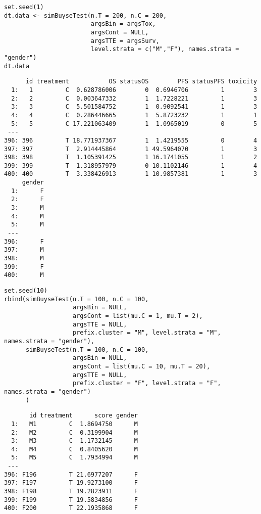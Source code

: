 \documentclass[12pt]{article}
\begin{document}
\lstset{language=r,label= ,caption= ,captionpos=b,numbers=none}
\begin{lstlisting}
set.seed(1)
dt.data <- simBuyseTest(n.T = 200, n.C = 200,
                        argsBin = argsTox,
                        argsCont = NULL,
                        argsTTE = argsSurv,
                        level.strata = c("M","F"), names.strata = "gender")
dt.data
\end{lstlisting}

\begin{verbatim}
      id treatment           OS statusOS        PFS statusPFS toxicity
  1:   1         C  0.628786006        0  0.6946706         1        3
  2:   2         C  0.003647332        1  1.7228221         1        3
  3:   3         C  5.501584752        1  0.9092541         1        3
  4:   4         C  0.286446665        1  5.8723232         1        1
  5:   5         C 17.221063409        1  1.0965019         0        5
 ---                                                                  
396: 396         T 18.771937367        1  1.4219555         0        4
397: 397         T  2.914445864        1 49.5964070         1        3
398: 398         T  1.105391425        1 16.1741055         1        2
399: 399         T  1.318957979        0 10.1102146         1        4
400: 400         T  3.338426913        1 10.9857381         1        3
     gender
  1:      F
  2:      F
  3:      M
  4:      M
  5:      M
 ---       
396:      F
397:      M
398:      M
399:      F
400:      M
\end{verbatim}


\lstset{language=r,label= ,caption= ,captionpos=b,numbers=none}
\begin{lstlisting}
set.seed(10)
rbind(simBuyseTest(n.T = 100, n.C = 100,
                   argsBin = NULL,
                   argsCont = list(mu.C = 1, mu.T = 2),
                   argsTTE = NULL,
                   prefix.cluster = "M", level.strata = "M", names.strata = "gender"),
      simBuyseTest(n.T = 100, n.C = 100,
                   argsBin = NULL,
                   argsCont = list(mu.C = 10, mu.T = 20),
                   argsTTE = NULL,
                   prefix.cluster = "F", level.strata = "F", names.strata = "gender")
      )
\end{lstlisting}

\begin{verbatim}
       id treatment      score gender
  1:   M1         C  1.8694750      M
  2:   M2         C  0.3199904      M
  3:   M3         C  1.1732145      M
  4:   M4         C  0.8405620      M
  5:   M5         C  1.7934994      M
 ---                                 
396: F196         T 21.6977207      F
397: F197         T 19.9273100      F
398: F198         T 19.2823911      F
399: F199         T 19.5834856      F
400: F200         T 22.1935868      F
\end{verbatim}
\end{document}
